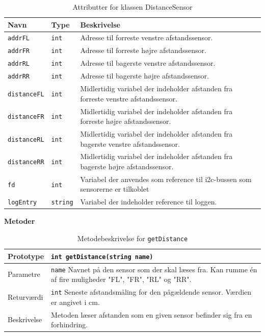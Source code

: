 \begin{table}[h]
\begin{tabularx}{\textwidth}{| Z | Z | L{10cm} |} \hline
Navn & Type & Beskrivelse \\\hline
\texttt{addrFL} 	& \texttt{int} 		&Adresse til forreste venstre afstandssensor.\\\hline
\texttt{addrFR} 	& \texttt{int} 		&Adresse til forreste højre afstandssensor.\\\hline
\texttt{addrRL} 	& \texttt{int} 		&Adresse til bagerste venstre afstandssensor.\\\hline
\texttt{addrRR} 	& \texttt{int} 		&Adresse til bagerste højre afstandssensor.\\\hline
\texttt{distanceFL} & \texttt{int} 		&Midlertidig variabel der indeholder afstanden fra forreste venstre afstandssensor.\\\hline
\texttt{distanceFR} & \texttt{int} 		&Midlertidig variabel der indeholder afstanden fra forreste højre afstandssensor.\\\hline
\texttt{distanceRL} & \texttt{int} 		&Midlertidig variabel der indeholder afstanden fra bagerste venstre afstandssensor.\\\hline
\texttt{distanceRR} & \texttt{int} 		&Midlertidig variabel der indeholder afstanden fra bagerste højre afstandssensor.\\\hline
\texttt{fd} 		& \texttt{int} 		&Variabel der anvendes som reference til i2c-bussen som sensorerne er tilkoblet\\\hline
\texttt{logEntry} 	& \texttt{string} 	&Variabel der indeholder reference til loggen.\\\hline
\end{tabularx}
\caption{Attributter for klassen DistanceSensor}
\label{table:attr_distancesensor}
\end{table}
\clearpage

\textbf{Metoder}

\begin{table}[h]
\begin{tabularx}{\textwidth}{| L{2.5 cm} | Z |} \hline
Prototype 	& \texttt{int getDistance(string name)} \\\hline
Parametre 	& \texttt{name} \newline Navnet på den sensor som der skal læses fra. Kan rumme én af fire muligheder "FL", "FR", "RL" og "RR". \\\hline
Returværdi 	& \texttt{int} \newline Seneste afstandsmåling for den pågældende sensor. Værdien er angivet i cm. \\\hline
Beskrivelse & Metoden læser afstanden som en given sensor befinder sig fra en forhindring. \\\hline
\end{tabularx}
\caption{Metodebeskrivelse for \texttt{getDistance}}
\label{table:met_getdistance}
\end{table}
\clearpage


